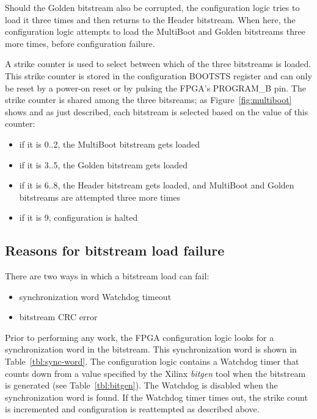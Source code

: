 \documentclass[a4paper,11pt]{article}
\begin{document}
Should the Golden bitstream also be corrupted, the configuration logic
tries to load it three times and then returns to the Header bitstream. When here,
the configuration logic attempts to load the MultiBoot and Golden bitstreams three
more times, before configuration failure.

A strike counter is used to select between which of the three bitstreams is loaded.
This strike counter is stored in the configuration BOOTSTS register and can only be
reset by a power-on reset or by pulsing the FPGA's PROGRAM\_B pin. The strike counter
is shared among the three bitsreams; as Figure~\ref{fig:multiboot} shows and as just
described, each bitstream is selected based on the value of this counter:

\begin{itemize}
  \item if it is 0..2, the MultiBoot bitstream gets loaded
  \item if it is 3..5, the Golden bitstream gets loaded
  \item if it is 6..8, the Header bitstream gets loaded, and MultiBoot and Golden
  bitstreams are attempted three more times
  \item if it is 9, configuration is halted
\end{itemize}

\subsection{Reasons for bitstream load failure}

There are two ways in which a bitstream load can fail:
\begin{itemize}
  \item synchronization word Watchdog timeout
  \item bitstream CRC error
\end{itemize}

Prior to performing any work, the FPGA configuration logic looks for a synchronization word
in the bitstream. This synchronization word is shown in Table~\ref{tbl:sync-word}. The
configuration logic contains a Watchdog timer that counts down from a value specified by
the Xilinx \textit{bitgen} tool when the bitstream is generated (see Table~\ref{tbl:bitgen}).
The Watchdog is disabled when the synchronization word is found. If the Watchdog timer
times out, the strike count is incremented and configuration is reattempted as described above.
\end{document}
